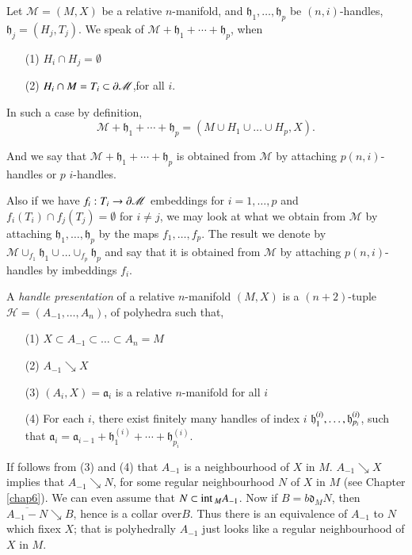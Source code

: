 Let $\mathscr{M}=(M,X)$ be a relative $n$-manifold, and $\mathfrak{h}_{1},\ldots,\mathfrak{h}_{p}$ be $(n,i)$-handles, $\mathfrak{h}_{j}=(H_{j},T_{j})$. We speak of $\mathscr{M}+\mathfrak{h}_{1}+\cdots+\mathfrak{h}_{p}$, when
\begin{itemize}
\item[(1)] $H_{i}\cap H_{j}=\emptyset$

\item[(2)] $H_{i}\cap M=T_{i}\subset \partial \mathscr{M}$,\pageoriginale for all $i$.
\end{itemize}

In such a case by definition,
$$
\mathscr{M}+\mathfrak{h}_{1}+\cdots+\mathfrak{h}_{p}=(M\cup H_{1}\cup\ldots\cup H_{p},X).
$$

And we say that $\mathscr{M}+\mathfrak{h}_{1}+\cdots+\mathfrak{h}_{p}$ is obtained from $\mathscr{M}$ by attaching $p(n,i)$-handles or $p$ $i$-handles.

Also if we have $f_{i}:T_{i}\to \partial \mathscr{M}$ embeddings for $i=1,\ldots,p$ and $f_{i}(T_{i})\cap f_{j}(T_{j})=\emptyset$ for $i\neq j$, we may look at what we obtain from $\mathscr{M}$ by attaching $\mathfrak{h}_{1},\ldots,\mathfrak{h}_{p}$ by the maps $f_{1},\ldots,f_{p}$. The result we denote by $\mathscr{M}\cup_{f_{1}}\mathfrak{h}_{1}\cup \ldots \cup_{f_{p}}\mathfrak{h}_{p}$ and say that it is obtained from $\mathscr{M}$ by attaching $p(n,i)$-handles by imbeddings $f_{i}$.

\begin{definition}\label{chap8-defi8.2.2}
A {\em handle presentation} of a relative $n$-manifold $(M,X)$ is a $(n+2)$-tuple $\mathscr{H}=(A_{-1},\ldots,A_{n})$, of polyhedra such that,
\begin{itemize}
\item[(1)] $X\subset A_{-1}\subset\ldots\subset A_{n}=M$

\item[(2)] $A_{-1}\searrow X$

\item[(3)] $(A_{i},X)=\mathfrak{a}_{i}$ is a relative $n$-manifold for all $i$

\item[(4)] For each $i$, there exist finitely many handles of index
  $i$ \; $\mathfrak{h}^{(i)}_{1},\ldots,\break\mathfrak{h}^{(i)}_{p_{i}}$,
  such that
  $\mathfrak{a}_{i}=\mathfrak{a}_{i-1}+\mathfrak{h}^{(i)}_{1}+\cdots
  +\mathfrak{h}^{(i)}_{p_{i}}$. 
\end{itemize}

If follows from (3) and (4) that $A_{-1}$ is a neighbourhood of $X$ in $M$. $A_{-1}\searrow X$ implies that $A_{-1}\searrow N$, for some regular neighbourhood $N$ of $X$ in $M$ (see Chapter \ref{chap6}). We can even assume that $N\subset \text{int\,}_{M}A_{-1}$. Now if $B=b\mathfrak{d}_{M}N$, then $\overline{A_{-1}-N}\searrow B$, hence is a collar over\pageoriginale $B$. Thus there is an equivalence of $A_{-1}$ to $N$ which fixex $X$; that is polyhedrally $A_{-1}$ just looks like a regular neighbourhood of $X$ in $M$.
\end{definition}


